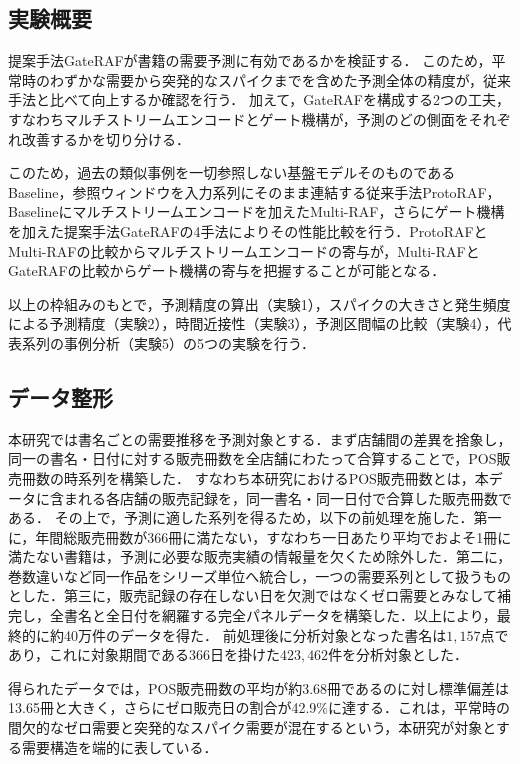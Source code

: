 \documentclass[twocolumn, lastpage]{jarticle}
\newif\ifrevmark
\newcommand{\revA}[1]{\ifrevmark{\color{blue}#1}\else#1\fi}
\newcommand{\revB}[1]{\ifrevmark{\color{red}#1}\else#1\fi}
\begin{document}
\subsection{実験概要}
提案手法GateRAFが書籍の需要予測に有効であるかを検証する．
このため，平常時のわずかな需要から突発的なスパイクまでを含めた予測全体の精度が，従来手法と比べて向上するか確認を行う．
加えて，GateRAFを構成する2つの工夫，すなわちマルチストリームエンコードとゲート機構が，予測のどの側面をそれぞれ改善するかを切り分ける．

このため，過去の類似事例を一切参照しない基盤モデルそのものであるBaseline，参照ウィンドウを入力系列にそのまま連結する従来手法ProtoRAF，Baselineにマルチストリームエンコードを加えたMulti-RAF，さらにゲート機構を加えた提案手法GateRAFの4手法によりその性能比較を行う．ProtoRAFとMulti-RAFの比較からマルチストリームエンコードの寄与が，Multi-RAFとGateRAFの比較からゲート機構の寄与を把握することが可能となる．


以上の枠組みのもとで，予測精度の算出（実験1），\revA{スパイクの大きさと発生頻度による予測精度}（実験2），時間近接性（実験3），予測区間幅の比較（実験4），代表系列の事例分析（実験5）の5つの実験を行う．


\subsection{データ整形}
本研究では書名ごとの需要推移を予測対象とする．まず店舗間の差異を捨象し，同一の書名・日付に対する販売冊数を全店舗にわたって合算することで，POS販売冊数の時系列を構築した．%
\revB{すなわち本研究におけるPOS販売冊数とは，本データに含まれる各店舗の販売記録を，同一書名・同一日付で合算した販売冊数である．}%
その上で，予測に適した系列を得るため，以下の前処理を施した．第一に，年間総販売冊数が366冊に満たない，すなわち一日あたり平均でおよそ1冊に満たない書籍は，予測に必要な販売実績の情報量を欠くため除外した．第二に，巻数違いなど同一作品をシリーズ単位へ統合し，一つの需要系列として扱うものとした．第三に，販売記録の存在しない日を欠測ではなくゼロ需要とみなして補完し，全書名と全日付を網羅する完全パネルデータを構築した．以上により，最終的に約40万件のデータを得た．%
\revB{前処理後に分析対象となった書名は$1{,}157$点であり，これに対象期間である$366$日を掛けた$423{,}462$件を分析対象とした．}%

得られたデータでは，POS販売冊数の平均が約3.68冊であるのに対し標準偏差は13.65冊と大きく，さらにゼロ販売日の割合が42.9\%に達する．これは，平常時の間欠的なゼロ需要と突発的なスパイク需要が混在するという，本研究が対象とする需要構造を端的に表している．
\end{document}
